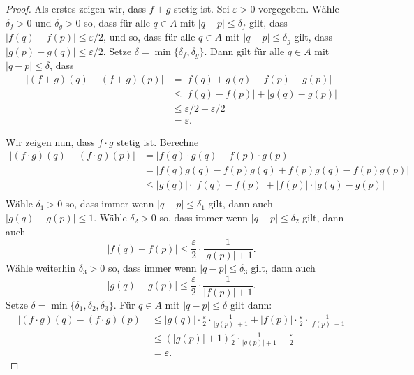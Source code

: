 \documentclass[../main.tex]{subfiles}
\begin{document}
\begin{proof}
  Als erstes zeigen wir,
  dass $f  + g$ stetig ist.
  Sei $\varepsilon > 0$ vorgegeben.
  Wähle $\delta_f > 0$ und  $\delta_g > 0$ 
  so, dass für alle $q \in A$ mit
  $|q - p| \leq \delta_f$ gilt, dass
  $|f(q) - f(p)| \leq \varepsilon/2$,
  und so, dass für alle
  $q \in A$ mit $|q - p| \leq \delta_g$ 
  gilt, dass
  $|g(p) - g(q)| \leq \varepsilon/2$.
  Setze $\delta = \min \{\delta_f, \delta_g\}$.
  Dann gilt für alle $q \in A$ mit
  $|q - p| \leq \delta$, dass
  \begin{align*}
  |(f + g)(q) - (f + g)(p)| &     = |f(q) + g(q) - f(p) - g(p)|\\
                            & \leq |f(q) - f(p)| + |g(q) - g(p)|\\
                            & \leq \varepsilon/2 + \varepsilon/2\\
                            &= \varepsilon.
  \end{align*}

  Wir zeigen nun, dass $f \cdot g$ stetig ist.
  Berechne
  \begin{align*}
     |(f\cdot g)(q) - (f \cdot g)(p)|
     & = |f(q) \cdot g(q) - f(p) \cdot g(p)| \\
     & = |f(q)g(q) - f(p)g(q) + f(p)g(q) - f(p) g(p)| \\
     & \leq |g(q)| \cdot |f(q) - f(p)| + 
     |f(p)| \cdot |g(q) - g(p)| \\
  \end{align*}
  Wähle $\delta_1 > 0$ so, dass immer wenn
  $|q - p| \leq \delta_1$ gilt, dann auch
  $|g(q) - g(p)| \leq 1$. Wähle
  $\delta_2 > 0$ so, dass immer
  wenn $|q - p| \leq \delta_2$ gilt, dann auch
  \[
    |f(q) - f(p)| \leq \frac{\varepsilon}{2} \cdot
    \frac{1}{|g(p)| + 1}.
  \]
  Wähle weiterhin $\delta_3 > 0$ so, dass immer wenn
  $|q - p| \leq \delta_3$ gilt, dann auch
  \[
    |g(q) - g(p)| \leq \frac{\varepsilon}{2} \cdot
    \frac{1}{|f(p)| + 1}.
  \]
  Setze $\delta = \min \{\delta_1, \delta_2, \delta_3 \}$.
  Für $q \in A$ mit $|q - p| \leq \delta$ gilt dann:
  \begin{align*}
    |(f \cdot g)(q) - (f \cdot g)(p)|
    &\leq |g(q)| \cdot \frac{\varepsilon}{2} \cdot  
    \frac{1}{|g(p)| + 1}
    + |f(p)| \cdot \frac{\varepsilon}{2}
    \cdot \frac{1}{|f(p)| + 1}\\
    & \leq (|g(p)| + 1) \frac{\varepsilon}{2}
    \cdot \frac{1}{|g(p)| + 1} + \frac{\varepsilon}{2}  \\
    &= \varepsilon.
  \end{align*}
  

\end{proof}
\end{document}
